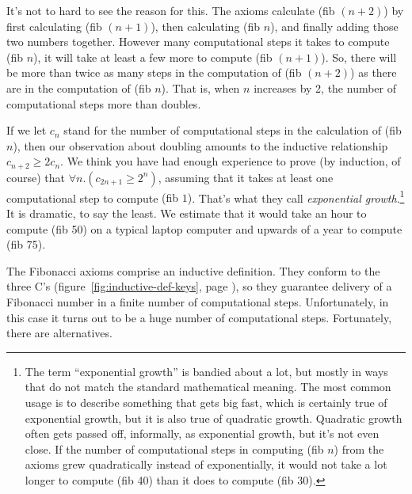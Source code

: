 It's not to hard to see the reason for this.
The axioms calculate \textsf{(fib $(n+2)$)} by first calculating
(\textsf{fib $(n+1)$)}, then calculating \textsf{(fib $n$)}, and finally
adding those two numbers together.
However many computational steps it takes to compute \textsf{(fib $n$)},
it will take at least a few more to compute \textsf{(fib $(n+1)$)}.
So, there will be more than twice as many steps in the computation of \textsf{(fib $(n+2)$)}
as there are in the computation of \textsf{(fib $n$)}.
That is, when $n$ increases by 2, the number of computational steps more than doubles.

If we let $c_n$ stand for the number of computational steps in the calculation
of \textsf{(fib $n$)}, then our observation about doubling amounts to the
inductive relationship $c_{n+2} \geq 2c_n$.
We think you have had enough experience to prove (by induction, of course)
that $\forall n.(c_{2n+1} \geq 2^n)$,
assuming that it takes at least one computational step to compute \textsf{(fib $1$)}.
That's what they call \emph{exponential growth}.\footnote{The term
``exponential growth'' is bandied about a lot, but mostly
in ways that do not match the standard mathematical meaning.
The most common usage is to describe something that
gets big fast, which is certainly true of exponential growth,
but it is also true of quadratic growth.
Quadratic growth often gets passed off, informally, as exponential growth,
but it's not even close. If the number of computational steps
in computing \textsf{(fib $n$)} from the axioms grew quadratically instead of exponentially,
it would not take a lot longer to compute \textsf{(fib 40)} than it does to compute \textsf{(fib 30)}.}
It is dramatic, to say the least. We estimate that it would take an hour to compute
\textsf{(fib 50)} on a typical laptop computer and upwards of a year to compute \textsf{(fib 75)}.

The Fibonacci axioms comprise an
inductive definition.
They conform to the three C's
(figure~\ref{fig:inductive-def-keys}, page \pageref{fig:inductive-def-keys}),
so they guarantee delivery of a Fibonacci number
in a finite number of computational steps.
Unfortunately, in this case it turns out to be
a huge number of computational steps.
Fortunately, there are alternatives.

